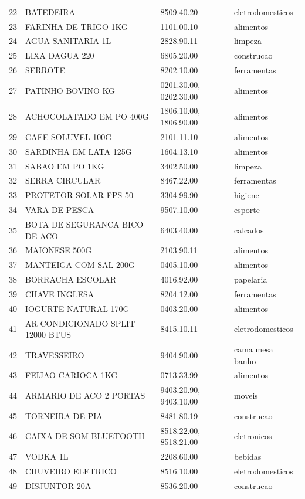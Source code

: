 \begin{apendicesenv}
\begin{center}
\begin{longtable}{r p{6.6cm} p{4.4cm} p{2.6cm}}
22 & BATEDEIRA & 8509.40.20 & eletrodomesticos \\
23 & FARINHA DE TRIGO 1KG & 1101.00.10 & alimentos \\
24 & AGUA SANITARIA 1L & 2828.90.11 & limpeza \\
25 & LIXA DAGUA 220 & 6805.20.00 & construcao \\
26 & SERROTE & 8202.10.00 & ferramentas \\
27 & PATINHO BOVINO KG & 0201.30.00, 0202.30.00 & alimentos \\
28 & ACHOCOLATADO EM PO 400G & 1806.10.00, 1806.90.00 & alimentos \\
29 & CAFE SOLUVEL 100G & 2101.11.10 & alimentos \\
30 & SARDINHA EM LATA 125G & 1604.13.10 & alimentos \\
31 & SABAO EM PO 1KG & 3402.50.00 & limpeza \\
32 & SERRA CIRCULAR & 8467.22.00 & ferramentas \\
33 & PROTETOR SOLAR FPS 50 & 3304.99.90 & higiene \\
34 & VARA DE PESCA & 9507.10.00 & esporte \\
35 & BOTA DE SEGURANCA BICO DE ACO & 6403.40.00 & calcados \\
36 & MAIONESE 500G & 2103.90.11 & alimentos \\
37 & MANTEIGA COM SAL 200G & 0405.10.00 & alimentos \\
38 & BORRACHA ESCOLAR & 4016.92.00 & papelaria \\
39 & CHAVE INGLESA & 8204.12.00 & ferramentas \\
40 & IOGURTE NATURAL 170G & 0403.20.00 & alimentos \\
41 & AR CONDICIONADO SPLIT 12000 BTUS & 8415.10.11 & eletrodomesticos \\
42 & TRAVESSEIRO & 9404.90.00 & cama mesa banho \\
43 & FEIJAO CARIOCA 1KG & 0713.33.99 & alimentos \\
44 & ARMARIO DE ACO 2 PORTAS & 9403.20.90, 9403.10.00 & moveis \\
45 & TORNEIRA DE PIA & 8481.80.19 & construcao \\
46 & CAIXA DE SOM BLUETOOTH & 8518.22.00, 8518.21.00 & eletronicos \\
47 & VODKA 1L & 2208.60.00 & bebidas \\
48 & CHUVEIRO ELETRICO & 8516.10.00 & eletrodomesticos \\
49 & DISJUNTOR 20A & 8536.20.00 & construcao \\
\end{longtable}
\end{center}


\end{apendicesenv}
